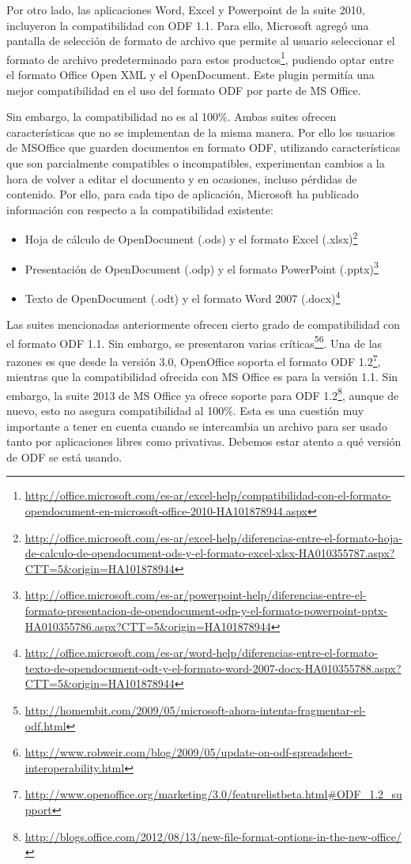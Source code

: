\documentclass[12pt]{article}
\begin{document}
Por otro lado, las aplicaciones Word, Excel y Powerpoint de la suite 2010, incluyeron la compatibilidad con ODF 1.1. Para ello, Microsoft agregó una pantalla de selección de formato de archivo que permite al usuario seleccionar el formato de archivo predeterminado para estos productos\footnote{\url{http://office.microsoft.com/es-ar/excel-help/compatibilidad-con-el-formato-opendocument-en-microsoft-office-2010-HA101878944.aspx}}, pudiendo optar entre el formato Office Open XML y el OpenDocument. Este plugin permitía una mejor compatibilidad en el uso del formato ODF por parte de MS Office.

Sin embargo, la compatibilidad no es al 100\%. Ambas suites ofrecen características que no se implementan de la misma manera. Por ello los usuarios de MSOffice que guarden documentos en formato ODF, utilizando características que son parcialmente compatibles o incompatibles, experimentan cambios a la hora de volver a editar el documento y en ocasiones, incluso pérdidas de contenido. Por ello, para cada tipo de aplicación, Microsoft ha publicado información con respecto a la compatibilidad existente:
\begin{itemize}
\item Hoja de cálculo de OpenDocument (.ods) y el formato Excel (.xlsx)\footnote{\url{http://office.microsoft.com/es-ar/excel-help/diferencias-entre-el-formato-hoja-de-calculo-de-opendocument-ods-y-el-formato-excel-xlsx-HA010355787.aspx?CTT=5\&origin=HA101878944}}
\item Presentación de OpenDocument (.odp) y el formato PowerPoint (.pptx)\footnote{\url{http://office.microsoft.com/es-ar/powerpoint-help/diferencias-entre-el-formato-presentacion-de-opendocument-odp-y-el-formato-powerpoint-pptx-HA010355786.aspx?CTT=5\&origin=HA101878944}}
\item Texto de OpenDocument (.odt) y el formato Word 2007 (.docx)\footnote{\url{http://office.microsoft.com/es-ar/word-help/diferencias-entre-el-formato-texto-de-opendocument-odt-y-el-formato-word-2007-docx-HA010355788.aspx?CTT=5\&origin=HA101878944}}
\end{itemize}

Las suites mencionadas anteriormente ofrecen cierto grado de compatibilidad con el formato ODF 1.1. Sin embargo, se presentaron varias críticas\footnote{\url{http://homembit.com/2009/05/microsoft-ahora-intenta-fragmentar-el-odf.html}}\footnote{\url{http://www.robweir.com/blog/2009/05/update-on-odf-spreadsheet-interoperability.html}}. Una de las razones es que desde la versión 3.0, OpenOffice soporta el formato ODF 1.2\footnote{\url{http://www.openoffice.org/marketing/3.0/featurelistbeta.html\#ODF\_1.2\_support}}, mientras que la compatibilidad ofrecida con MS Office es para la versión 1.1. Sin embargo, la suite 2013 de MS Office ya ofrece soporte para ODF 1.2\footnote{\url{http://blogs.office.com/2012/08/13/new-file-format-options-in-the-new-office/}}, aunque de nuevo, esto no asegura compatibilidad al 100\%. Esta es una cuestión muy importante a tener en cuenta cuando se intercambia un archivo para ser usado tanto por aplicaciones libres como privativas. Debemos estar atento a qué versión de ODF se está usando.
\end{document}
